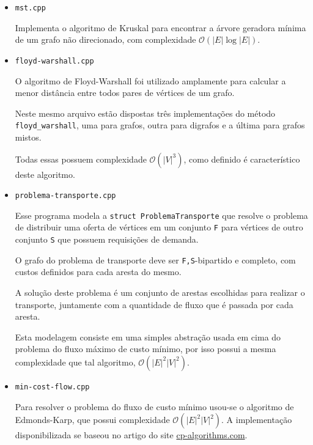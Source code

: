 \begin{itemize}
    \item \texttt{mst.cpp}

        Implementa o algoritmo de Kruskal para encontrar a árvore geradora mínima de um grafo não direcionado, com complexidade $\mathcal{O}(|E|\log |E|)$.
        
    \item \texttt{floyd-warshall.cpp}

        O algoritmo de Floyd-Warshall foi utilizado amplamente para calcular a menor distância entre todos pares de vértices de um grafo.

        Neste mesmo arquivo estão dispostas três implementações do método \texttt{floyd\_warshall}, uma para grafos, outra para digrafos e a última para grafos mistos.

        Todas essas possuem complexidade $\mathcal{O}(|V|^3)$, como definido é característico deste algoritmo.

    \item \texttt{problema-transporte.cpp}

        Esse programa modela a \texttt{struct ProblemaTransporte} que resolve o problema de distribuir uma oferta de vértices em um conjunto  \texttt{F} para vértices de outro conjunto \texttt{S} que possuem requisições de demanda.

        O grafo do problema de transporte deve ser \texttt{F,S}-bipartido e completo, com custos definidos para cada aresta do mesmo.

        A solução deste problema é um conjunto de arestas escolhidas para realizar o transporte, juntamente com a quantidade de fluxo que é passada por cada aresta.

        Esta modelagem consiste em uma simples abstração usada em cima do problema do fluxo máximo de custo mínimo, por isso possui a mesma complexidade que tal algoritmo, $\mathcal{O}(|E|^2 |V|^2)$.
        
    \item \texttt{min-cost-flow.cpp}

        Para resolver o problema do fluxo de custo mínimo usou-se o algoritmo de Edmonds-Karp, que possui complexidade $\mathcal{O}(|E|^2 |V|^2 )$.
        A implementação disponibilizada se baseou no artigo \cite{min-cost} do site \href{https://cp-algorithms.com/}{cp-algorithms.com}.
        
\end{itemize}

